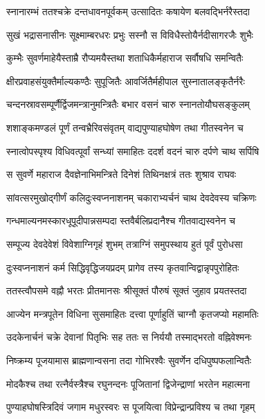 \twolineshloka
{स्नानारम्भं ततश्चक्रे दन्तधावनपूर्वकम्}
{उत्सादितः कषायेण बलवद्भिर्नरैस्तदा}%

\twolineshloka
{सुखं भद्रासनासीनः सूक्ष्माम्बरधरः प्रभुः}
{सस्नौ स विविधैस्तोयैर्नदीसागरजैः शुभैः}%

\twolineshloka
{कुम्भैः सुवर्णमाहेयैस्ताम्रै रौप्यमयैस्तथा}
{शताधिकैर्महाराज सर्वौषधि समन्वितैः}%

\twolineshloka
{क्षीरप्रवाहसंयुक्तैर्माल्यकण्ठैः सुपूजितैः}
{आवर्जितैर्महीपाल सुस्नातालङ्कृतैर्नरैः}%

\twolineshloka
{चन्दनस्रावसम्पूर्णैर्द्विजमन्त्रानुमन्त्रितैः}
{बभार वसनं चारु स्नानतोयौघसङ्कुलम्}%

\twolineshloka
{शशाङ्कमण्डलं पूर्णं तन्वभ्रैरिवसंवृतम्}
{वाद्यपुण्याहघोषेण तथा गीतस्वनेन च} %

\twolineshloka
{स्नात्वोपस्पृश्य विधिवत्पूर्वां सन्ध्यां समाहितः}
{ददर्श वदनं चारु दर्पणे चाथ सर्पिषि}%

\twolineshloka
{स सुवर्णे महाराज दैवज्ञेनाभिमन्त्रिते}
{दिनेशं तिथिनक्षत्रं ततः शुश्राव राघवः}%

\twolineshloka
{सांवत्सरमुखोद्गीर्णं कलिदुःस्वप्ननाशनम्}
{चकाराभ्यर्चनं चाथ देवदेवस्य चक्रिणः}%

\twolineshloka
{गन्धमाल्यनमस्कारधूपूदीपान्नसम्पदा}
{स्तवैर्बलिप्रदानैश्च गीतवाद्यस्वनेन च}%

\twolineshloka
{सम्पूज्य देवदेवेशं विवेशाग्निगृहं शुभम्}
{तत्राग्निं समुपस्थाय हुतं पूर्वं पुरोधसा}%

\twolineshloka
{दुःस्वप्ननाशनं कर्म सिद्धिवृद्धिजयप्रदम्}
{प्रागेव तस्य कृतवान्विद्वान्नृपपुरोहितः}%

\twolineshloka
{ततस्त्वौपसमे वह्नौ भरतः प्रीतमानसः}
{श्रीसूक्तं पौरुषं सूक्तं जुहाव प्रयतस्तदा}%

\twolineshloka
{आज्येन मन्त्रपूतेन विधिना सुसमाहितः}
{दत्त्वा पूर्णाहुतिं चाग्नौ कृतजप्यो महामतिः}%

\twolineshloka
{उदकेनार्चनं चक्रे देवानां पितृभिः सह}
{ततः स निर्ययौ तस्माद्भरतो वह्निवेश्मनः}%

\twolineshloka
{निष्क्रम्य पूजयामास ब्राह्मणान्वसना तदा}
{गोभिरश्वैः सुवर्णेन दधिपुष्पफलान्वितैः} %

\twolineshloka
{मोदकैश्च तथा रत्नैर्वस्त्रैश्च रघुनन्दनः}
{पूजितानां द्विजेन्द्राणां भरतेन महात्मना}%

\twolineshloka
{पुण्याहघोषस्त्रिदिवं जगाम मधुरस्वरः}
{स पूजयित्वा विप्रेन्द्रान्प्रविश्य च तथा गृहम्}%

